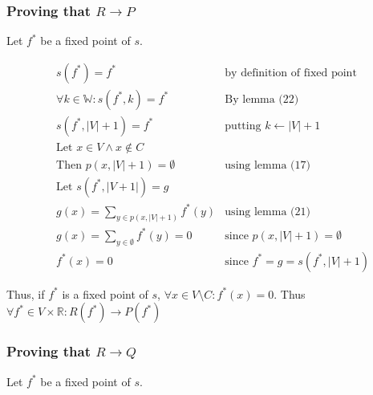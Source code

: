\documentclass[11pt]{article}
\begin{document}
\subsubsection{Proving that $R\rightarrow P$}

Let $f^{*}$ be a fixed point of $s$.

\begin{align*}
& \text{$s(f^{*})=f^{*}$} & \text{by definition of fixed point} \\
& \text{$\forall k \in\mathbb{W}: s(f^{*},k) = f^{*}$} & \text{By lemma (22)} \\
& \text{$s(f^{*},|V|+1)=f^{*}$} & \text{putting $k\leftarrow |V|+1$} \\
& \text{Let $x\in V \land x \not \in C$} & \text{} \\
& \text{Then $p(x,|V|+1) = \emptyset$} & \text{using lemma (17)} \\
& \text{Let $s(f^{*},|V+1|) = g$} & \text{} \\
& \text{$g(x) = \sum_{y \in p(x,|V|+1)} f^{*}(y)$} & \text{using lemma (21)} \\
& \text{$g(x) = \sum_{y \in \emptyset} f^{*}(y) = 0$} & \text{since $p(x,|V|+1) = \emptyset$} \\
& \text{$f^{*}(x)=0$} & \text{since $f^{*}=g=s(f^{*},|V|+1)$}
\end{align*}

Thus, if $f^{*}$ is a fixed point of $s$, $\forall x \in V \setminus C: f^{*}(x) = 0$. Thus $\forall f^{*} \in V \times \mathbb{R}: R(f^{*}) \rightarrow P(f^{*})$


\subsubsection{Proving that $R\rightarrow Q$}

Let $f^{*}$ be a fixed point of $s$.
\end{document}
